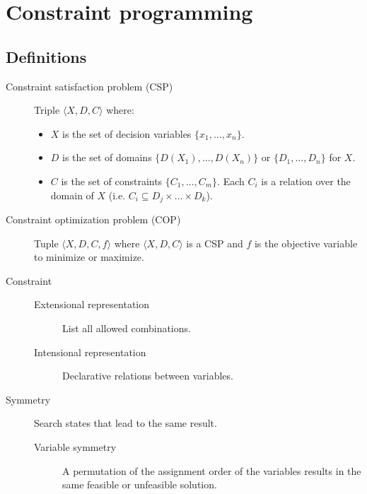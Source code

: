 \chapter{Constraint programming}



\section{Definitions}


\begin{description}
    \item[Constraint satisfaction problem (CSP)] 
        Triple $\langle X, D, C \rangle$ where:
        \begin{itemize}
            \item $X$ is the set of decision variables $\{ x_1, \dots, x_n \}$.
            \item $D$ is the set of domains $\{ D(X_1), \dots, D(X_n) \}$ or $\{ D_1, \dots, D_n \}$ for $X$.
            \item $C$ is the set of constraints $\{ C_1, \dots, C_m \}$.
                Each $C_i$ is a relation over the domain of $X$ (i.e. $C_i \subseteq D_j \times \dots \times D_k$).
        \end{itemize}


    \item[Constraint optimization problem (COP)] 
        Tuple $\langle X, D, C, f \rangle$ where $\langle X, D, C \rangle$ is a CSP and 
        $f$ is the objective variable to minimize or maximize.


    \item[Constraint] 
        \phantom{}
        \begin{description}
            \item[Extensional representation] List all allowed combinations. 
            \item[Intensional representation] Declarative relations between variables.
        \end{description}


    \item[Symmetry] \marginnote{}
        Search states that lead to the same result.    

        \begin{description}
            \item[Variable symmetry] 
                A permutation of the assignment order of the variables results in the same feasible or unfeasible solution.


\end{description}
\end{description}
